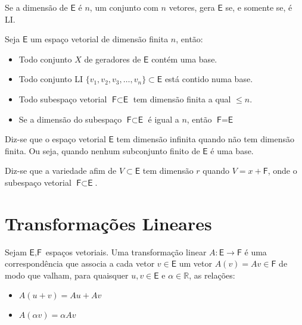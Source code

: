 \documentclass[10pt,a4paper]{article}
\begin{document}
\begin{theorem}
	Se a dimensão de $\textsf{E}$ é $n$, um conjunto com $n$ vetores, gera $\textsf{E}$ se, e somente se, é LI.
\end{theorem}

\begin{theorem}
	Seja $\textsf{E}$ um espaço vetorial de dimensão finita $n$, então:
	\begin{itemize}
		\item Todo conjunto $X$ de geradores de $\textsf{E}$ contém uma base.
		\item Todo conjunto LI $\{ v_1, v_2, v_3, \dots, v_n \} \subset \textsf{E}$ está contido numa base.
		\item Todo subespaço vetorial $\textsf{F} \subset \textsf{E}$ tem dimensão finita a qual $\leq n$.
		\item Se a dimensão do subespaço $\textsf{F} \subset \textsf{E}$ é igual a $n$, então $\textsf{F} = \textsf{E}$
	\end{itemize}
\end{theorem}

\begin{definition}
	Diz-se que o espaço vetorial $\textsf{E}$ tem dimensão infinita quando não tem dimensão finita. Ou seja, quando nenhum subconjunto finito de $\textsf{E}$ é uma base.
\end{definition}

\begin{definition}
	Diz-se que a variedade afim de $V \subset \textsf{E}$ tem dimensão $r$ quando $V = x + \textsf{F}$, onde o subespaço vetorial $\textsf{F} \subset \textsf{E}$.
\end{definition}


\section{Transformações Lineares}

\begin{definition}
	Sejam $\textsf{E}, \textsf{F}$ espaços vetoriais. Uma transformação linear $A:\textsf{E} \rightarrow \textsf{F}$ é uma correspondência que associa a cada vetor $v \in \textsf{E}$ um vetor $A(v) = Av \in \textsf{F}$ de modo que valham, para quaisquer $u, v \in \textsf{E}$ e $\alpha \in \mathbb{R}$, as relações:
	\begin{itemize}
		\item $A(u + v) = Au + Av$
		\item $A(\alpha v) = \alpha  Av$
	\end{itemize}
\end{definition}
\end{document}
